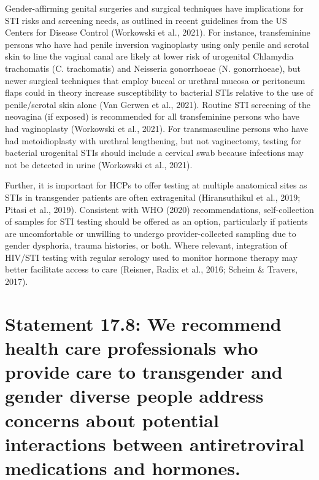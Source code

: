 \documentclass[
]{book}
\begin{document}
Gender-affirming genital surgeries and surgical
techniques have implications for STI risks and
screening needs, as outlined in recent guidelines
from the US Centers for Disease Control
(Workowski et al., 2021). For instance, transfeminine persons who have had penile inversion
vaginoplasty using only penile and scrotal skin
to line the vaginal canal are likely at lower risk
of urogenital Chlamydia trachomatis (C. trachomatis) and Neisseria gonorrhoeae (N. gonorrhoeae), but newer surgical techniques that
employ buccal or urethral mucosa or peritoneum
flaps could in theory increase susceptibility to
bacterial STIs relative to the use of penile/scrotal
skin alone (Van Gerwen et al., 2021). Routine
STI screening of the neovagina (if exposed) is
recommended for all transfeminine persons who
have had vaginoplasty (Workowski et al., 2021).
For transmasculine persons who have had metoidioplasty with urethral lengthening, but not vaginectomy, testing for bacterial urogenital STIs
should include a cervical swab because infections
may not be detected in urine (Workowski
et al., 2021).

Further, it is important for HCPs to offer testing at multiple anatomical sites as STIs in transgender patients are often extragenital
(Hiransuthikul et al., 2019; Pitasi et al., 2019).
Consistent with WHO (2020) recommendations,
self-collection of samples for STI testing should
be offered as an option, particularly if patients
are uncomfortable or unwilling to undergo
provider-collected sampling due to gender dysphoria, trauma histories, or both. Where relevant,
integration of HIV/STI testing with regular serology used to monitor hormone therapy may better
facilitate access to care (Reisner, Radix et al.,
2016; Scheim \& Travers, 2017).

\hypertarget{statement-17.8-we-recommend-health-care-professionals-who-provide-care-to-transgender-and-gender-diverse-people-address-concerns-about-potential-interactions-between-antiretroviral-medications-and-hormones.}{%
\section*{Statement 17.8: We recommend health care professionals who provide care to transgender and gender diverse people address concerns about potential interactions between antiretroviral medications and hormones.}\label{statement-17.8-we-recommend-health-care-professionals-who-provide-care-to-transgender-and-gender-diverse-people-address-concerns-about-potential-interactions-between-antiretroviral-medications-and-hormones.}}
\end{document}
